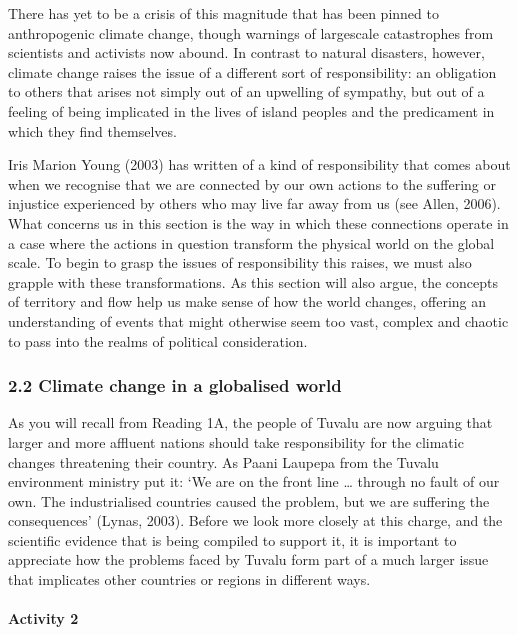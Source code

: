 \documentclass[letterpaper,10pt,english]{sphinxmanual}
\begin{document}
There has yet to be a crisis of this magnitude that has been pinned to anthropogenic climate change, though warnings of large\sphinxhyphen{}scale catastrophes from scientists and activists now abound. In contrast to natural disasters, however, climate change raises the issue of a different sort of responsibility: an obligation to others that arises not simply out of an upwelling of sympathy, but out of a feeling of being implicated in the lives of island peoples and the predicament in which they find
themselves.

Iris Marion Young (2003) has written of a kind of responsibility that comes about when we recognise that we are connected by our own actions to the suffering or injustice experienced by others who may live far away from us (see Allen, 2006). What concerns us in this section is the way in which these connections operate in a case where the actions in question transform the physical world on the global scale. To begin to grasp the issues of responsibility this raises, we must also grapple with
these transformations. As this section will also argue, the concepts of territory and flow help us make sense of how the world changes, offering an understanding of events that might otherwise seem too vast, complex and chaotic to pass into the realms of political consideration.


\subsubsection{2.2 Climate change in a globalised world}
\label{\detokenize{content/session_00/Part_00_02:2.2-Climate-change-in-a-globalised-world}}
As you will recall from Reading 1A, the people of Tuvalu are now arguing that larger and more affluent nations should take responsibility for the climatic changes threatening their country. As Paani Laupepa from the Tuvalu environment ministry put it: ‘We are on the front line … through no fault of our own. The industrialised countries caused the problem, but we are suffering the consequences’ (Lynas, 2003). Before we look more closely at this charge, and the scientific evidence that is being
compiled to support it, it is important to appreciate how the problems faced by Tuvalu form part of a much larger issue that implicates other countries or regions in different ways.


\paragraph{Activity 2}
\label{\detokenize{content/session_00/Part_00_02:Activity-2}}
\end{document}
